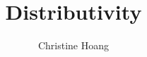\documentclass{article}
\title{Distributivity}
\author{Christine Hoang}
\begin{document}
\maketitle

\section{}
\end{document}
